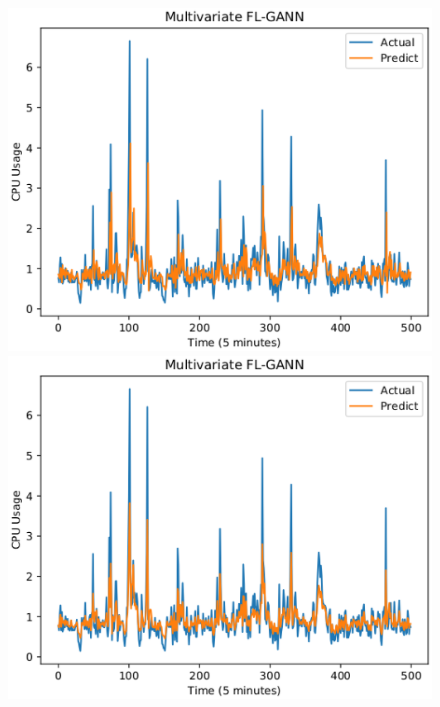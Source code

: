 \documentclass[runningheads]{llncs}
\begin{document}
\begin{figure}[ht]
	\centering
	\begin{minipage}[t]{4cm}
		\centering
		\includegraphics[width=1\textwidth]{images/pdf/multi_cpu_flgann.eps}
	\end{minipage}
	\begin{minipage}[t]{4cm}
		\centering
		\includegraphics[width=1\textwidth]{images/pdf/multi_cpu_flbfonn.eps}
	\end{minipage}
	\begin{minipage}[t]{4cm}
		\centering

\end{minipage}
\end{figure}
\end{document}
